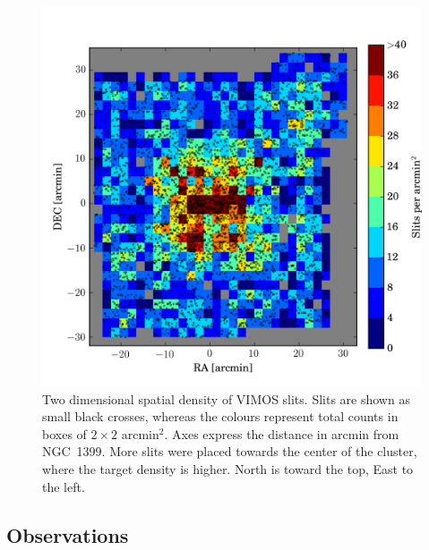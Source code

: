 \documentclass[useAMS,usenatbib]{mn2e}
\begin{document}

\begin{figure}
\centering
\includegraphics[width=\columnwidth]{figures/slitdist.png} 
\caption{Two dimensional spatial density of VIMOS slits. Slits are shown as 
small black crosses, whereas the colours represent total counts in boxes of 
$2\times2$ arcmin$^2$. Axes express the distance in arcmin from NGC~1399. More 
slits were placed towards the center of the cluster, where the target density 
is higher. North is toward the top, East to the left.}
\label{fig:2dsplit}
\end{figure}

\subsection{Observations}
\label{sec:observations}
\end{document}
